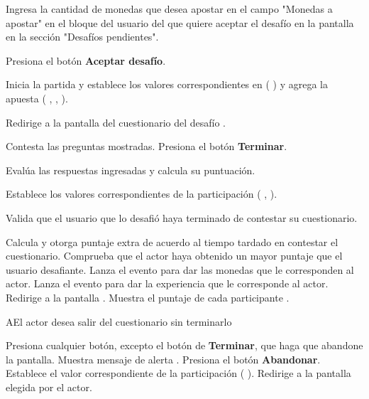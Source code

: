 \begin{UCtrayectoria}%
%

    \Actor Ingresa la cantidad de monedas que desea apostar en el campo "Monedas a apostar" en el bloque del usuario del que quiere aceptar el desafío en la pantalla  en la sección "Desafíos pendientes".

    \Actor Presiona el botón {\bf Aceptar desafío}.

    \Sistema Inicia la partida y establece los valores correspondientes en  (  ) y agrega la apuesta ( , ,  ).

    \Sistema Redirige a la pantalla del cuestionario del desafío .

    \Actor Contesta las preguntas mostradas. 
    \label{CU-C10-contesta-cuestionario}
    \Actor Presiona el botón {\bf Terminar}.

    \Sistema Evalúa las respuestas ingresadas y calcula su puntuación.

    \Sistema Establece los valores correspondientes de la participación  (
    ,
    ).

    \Sistema Valida que el usuario que lo desafió haya terminado de contestar su cuestionario. 

    \Sistema Calcula y otorga puntaje extra de acuerdo al tiempo tardado en contestar el cuestionario.
    \Sistema Comprueba que el actor haya obtenido un mayor puntaje que el usuario desafiante. 
    \Sistema Lanza el evento para dar las monedas que le corresponden al actor.
    \Sistema Lanza el evento para dar la experiencia que le corresponde al actor.
    \Sistema Redirige a la pantalla .
    \Sistema Muestra el puntaje de cada participante .

\end{UCtrayectoria}

\begin{UCtrayectoriaA}%
  {A}{El actor desea salir del cuestionario sin terminarlo}

  \Actor Presiona cualquier botón, excepto el botón de {\bf Terminar}, que haga que abandone la pantalla.
  \Sistema Muestra mensaje de alerta .
  \Actor Presiona el botón {\bf Abandonar}. 
  \Sistema Establece el valor correspondiente de la participación  (
  ).
  \Sistema Redirige a la pantalla elegida por el actor.

\end{UCtrayectoriaA}


